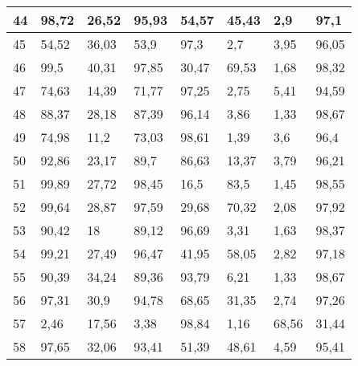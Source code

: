 \begin{longtable}[c]{|l|l|l|l|l|l|l|l|}
44              & 98,72        & 26,52        & 95,93       & 54,57         & 45,43         & 2,9           & 97,1          \\ \hline
45              & 54,52        & 36,03        & 53,9        & 97,3          & 2,7           & 3,95          & 96,05         \\ \hline
46              & 99,5         & 40,31        & 97,85       & 30,47         & 69,53         & 1,68          & 98,32         \\ \hline
47              & 74,63        & 14,39        & 71,77       & 97,25         & 2,75          & 5,41          & 94,59         \\ \hline
48              & 88,37        & 28,18        & 87,39       & 96,14         & 3,86          & 1,33          & 98,67         \\ \hline
49              & 74,98        & 11,2         & 73,03       & 98,61         & 1,39          & 3,6           & 96,4          \\ \hline
50              & 92,86        & 23,17        & 89,7        & 86,63         & 13,37         & 3,79          & 96,21         \\ \hline
51              & 99,89        & 27,72        & 98,45       & 16,5          & 83,5          & 1,45          & 98,55         \\ \hline
52              & 99,64        & 28,87        & 97,59       & 29,68         & 70,32         & 2,08          & 97,92         \\ \hline
53              & 90,42        & 18           & 89,12       & 96,69         & 3,31          & 1,63          & 98,37         \\ \hline
54              & 99,21        & 27,49        & 96,47       & 41,95         & 58,05         & 2,82          & 97,18         \\ \hline
55              & 90,39        & 34,24        & 89,36       & 93,79         & 6,21          & 1,33          & 98,67         \\ \hline
56              & 97,31        & 30,9         & 94,78       & 68,65         & 31,35         & 2,74          & 97,26         \\ \hline
57              & 2,46         & 17,56        & 3,38        & 98,84         & 1,16          & 68,56         & 31,44         \\ \hline
58              & 97,65        & 32,06        & 93,41       & 51,39         & 48,61         & 4,59          & 95,41         \\ \hline

\end{longtable}

